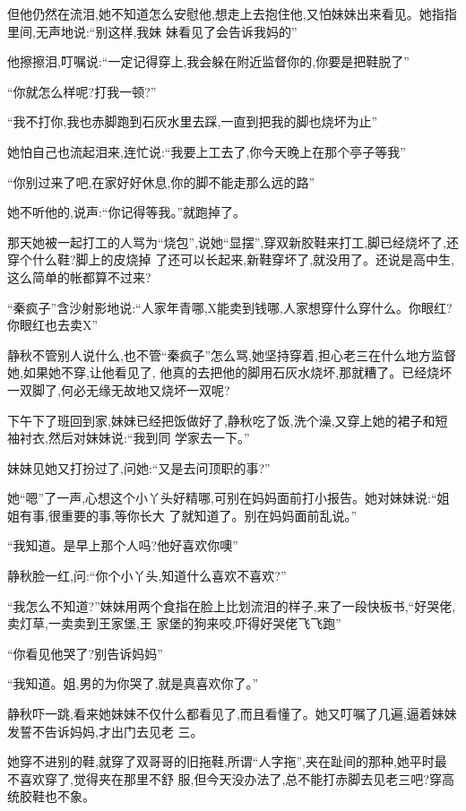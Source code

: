﻿\documentclass[12pt]{article}
\begin{document}
但他仍然在流泪,她不知道怎么安慰他,想走上去抱住他,又怕妹妹出来看见。她指指里间,无声地说:``别这样,我妹
妹看见了会告诉我妈的\myrule ''

他擦擦泪,叮嘱说:``一定记得\myrule 穿上,我会躲在\myrule 附近监督你的,你要是把鞋脱了\myrule ''

``你就怎么样呢?打我一顿?''

``我不打你,我也赤脚跑到石灰水里去踩,一直到把我的脚也烧坏为止\myrule ''

她怕自己也流起泪来,连忙说:``我要上工去了,你今天晚上\myrule 在那个亭子等我\myrule ''

``你别过来了吧,在家好好休息,你的脚不能走那么远的路\myrule ''

她不听他的,说声:``你记得等我。''就跑掉了。

那天她被一起打工的人骂为``烧包'',说她``显摆'',穿双新胶鞋来打工,脚已经烧坏了,还穿个什么鞋?脚上的皮烧掉
了还可以长起来,新鞋穿坏了,就没用了。还说是高中生,这么简单的帐都算不过来?

``秦疯子''含沙射影地说:``人家年青哪,X能卖到钱哪,人家想穿什么穿什么。你眼红?你眼红也去卖X\myrule ''

静秋不管别人说什么,也不管``秦疯子''怎么骂,她坚持穿着,担心老三在什么地方监督她,如果她不穿,让他看见了,
他真的去把他的脚用石灰水烧坏,那就糟了。已经烧坏一双脚了,何必无缘无故地又烧坏一双呢?

下午下了班回到家,妹妹已经把饭做好了,静秋吃了饭,洗个澡,又穿上她的裙子和短袖衬衣,然后对妹妹说:``我到同
学家去一下。''

妹妹见她又打扮过了,问她:``又是去问顶职的事?''

她``嗯''了一声,心想这个小丫头好精哪,可别在妈妈面前打小报告。她对妹妹说:``姐姐有事,很重要的事,等你长大
了就知道了。别在妈妈面前乱说。''

``我知道。是早上那个人吗?他好喜欢你噢\myrule ''

静秋脸一红,问:``你个小丫头,知道什么喜欢不喜欢?''

``我怎么不知道?''妹妹用两个食指在脸上比划流泪的样子,来了一段快板书,``好哭佬,卖灯草,一卖卖到王家堡,王
家堡的狗来咬,吓得好哭佬飞飞跑\myrule ''

``你\myrule 看见他\myrule 哭了?别告诉妈妈\myrule ''

``我知道。姐,男的为你哭了,就是真喜欢你了。''

静秋吓一跳,看来她妹妹不仅什么都看见了,而且看懂了。她又叮嘱了几遍,逼着妹妹发誓不告诉妈妈,才出门去见老
三。

她穿不进别的鞋,就穿了双哥哥的旧拖鞋,所谓``人字拖'',夹在趾间的那种,她平时最不喜欢穿了,觉得夹在那里不舒
服,但今天没办法了,总不能打赤脚去见老三吧?穿高统胶鞋也不象。
\end{document}
